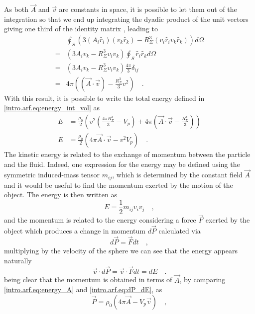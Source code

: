 As both $\vec A$ and $\vec v$ are constants in space, it is possible to let them out of the integration so that we end up integrating the dyadic product of the unit vectors giving one third of the identity matrix \cite[~p.28]{Landau}, leading to
\begin{align}
    &\oint_{S} \left(3(A_i\hat r_i)(v_k\hat r_k) - R_\Sigma^3(v_i\hat r_iv_k\hat r_k)\right)d\Omega \nonumber\\
    =&(3A_iv_k - R_\Sigma^3 v_iv_k)\oint_{S} \hat r_i\hat r_k d\Omega \nonumber\\
    =&(3A_iv_k - R_\Sigma^3 v_iv_k)\frac{4\pi}{3}\delta_{ij} \nonumber\\
    =&4\pi\left((\vec A\cdot\vec v) - \frac{R_\Sigma^3}{3}v^2\right)\quad.
\end{align}
With this result, it is possible to write the total energy defined in \eqref{intro.arf.eq:energy_int_vol} as 
\begin{align}
    E &= \frac{\rho_0}{2}\left(v^2\left(\frac{4\pi R_\Sigma^3}{3} - V_p\right) + 4\pi\left(\vec A\cdot\vec v - \frac{R_\Sigma^3}{3}\right)\right)\nonumber\\
    E &= \frac{\rho_0}{2}\left(4\pi\vec A\cdot\vec v - v^2V_p\right)\quad.\label{intro.arf.eq:energy_A}
\end{align}
The kinetic energy is related to the exchange of momentum between the particle and the fluid. Indeed, one expression for the energy may be defined using the symmetric induced-mass tensor $m_{ij}$, which is determined by the constant field $\vec A$ and it would be useful to find the momentum exerted by the motion of the object. The energy is then written as 
\begin{equation}
    E = \frac{1}{2}m_{ij}v_iv_j\quad,
\end{equation}
and the momentum is related to the energy considering a force $\vec F$ exerted by the object which produces a change in momentum $d\vec P$ calculated via
\begin{equation}
    d\vec P = \vec F dt \quad,
\end{equation}
multiplying by the velocity of the sphere we can see that the energy appears naturally
\begin{equation}\label{intro.arf.eq:dP_dE}
    \vec v\cdot d\vec P = \vec v\cdot\vec F dt = dE\quad.
\end{equation}
being clear that the momentum is obtained in terms of $\vec A$, by comparing \eqref{intro.arf.eq:energy_A} and \eqref{intro.arf.eq:dP_dE}, as
\begin{equation}\label{intro.arf.eq:P_A}
    \vec P = \rho_0\left(4\pi\vec A - V_p\vec v\right)\quad,
\end{equation}
